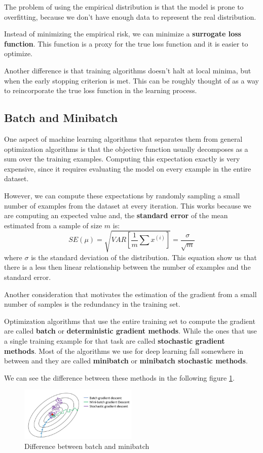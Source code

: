 The problem of using the empirical distribution is that the model is prone to
overfitting, because we don't have enough data to represent the real distribution.

Instead of minimizing the empirical risk, we can minimize a \textbf{surrogate
    loss function}. This function is a proxy for the true loss function and it
is easier to optimize.

Another difference is that training algorithms doesn't halt at local minima, but
when the early stopping criterion is met. This can be roughly thought of as a
way to reincorporate the true loss function in the learning process.
\subsection{Batch and Minibatch}
One aspect of machine learning algorithms that separates them from general
optimization algorithms is that the objective function usually decomposes as a
sum over the training examples. Computing this expectation exactly is very
expensive, since it requires evaluating the model on every example in the entire
dataset.

However, we can compute these expectations by randomly sampling a small number
of examples from the dataset at every iteration. This works because we are
computing an expected value and, the \textbf{standard error} of the mean estimated
from a sample of size $m$ is:
\begin{equation}
    SE(\mu) = \sqrt{VAR\left[\frac{1}{m}\sum x^{(i)}\right]} = \frac{\sigma}{\sqrt{m}}
\end{equation}
where $\sigma$ is the standard deviation of the distribution. This equation show
us that there is a less then linear relationship between the number of examples
and the standard error.

Another consideration that motivates the estimation of the gradient from a
small number of samples is the redundancy in the training set.

Optimization algorithms that use the entire training set to compute the gradient
are called \textbf{batch} or \textbf{deterministic gradient methods}. While the
ones that use a single training example for that task are called \textbf{stochastic
    gradient methods}. Most of the algorithms we use for deep learning fall
somewhere in between and they are called \textbf{minibatch} or \textbf{minibatch
    stochastic methods}.

We can see the difference between these methods in the following figure \ref{fig:batchminibatch}.
\begin{figure}[!ht]
    \centering
    \includegraphics[width=0.5\textwidth]{img/minibatchvsbatch.png}
    \caption{Difference between batch and minibatch}
    \label{fig:batchminibatch}
\end{figure}

